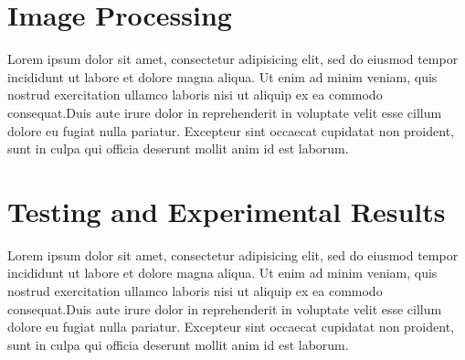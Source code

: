 \documentclass[twocolumn]{article}
\begin{document}
    \section{Image Processing}
        Lorem ipsum dolor sit amet, consectetur adipisicing elit, sed do eiusmod
        tempor incididunt ut labore et dolore magna aliqua. Ut enim ad minim veniam,
        quis nostrud exercitation ullamco laboris nisi ut aliquip ex ea commodo
        consequat.Duis aute irure dolor in reprehenderit in voluptate velit esse
        cillum dolore eu fugiat nulla pariatur. Excepteur sint occaecat cupidatat non
        proident, sunt in culpa qui officia deserunt mollit anim id est laborum.
     
     \section{Testing and Experimental Results}
        Lorem ipsum dolor sit amet, consectetur adipisicing elit, sed do eiusmod
        tempor incididunt ut labore et dolore magna aliqua. Ut enim ad minim veniam,
        quis nostrud exercitation ullamco laboris nisi ut aliquip ex ea commodo
        consequat.Duis aute irure dolor in reprehenderit in voluptate velit esse
        cillum dolore eu fugiat nulla pariatur. Excepteur sint occaecat cupidatat non
        proident, sunt in culpa qui officia deserunt mollit anim id est laborum.
    
    
    
\end{document}
